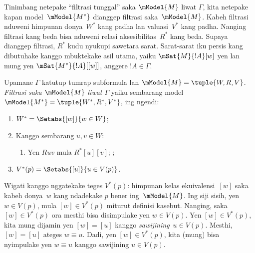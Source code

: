 \documentclass[../../../include/open-logic-section]{subfiles}
\begin{document}


Tinimbang netepake ``filtrasi tunggal'' saka $\mModel{M}$ liwat
$\Gamma$, kita netepake kapan model~$\mModel{M^*}$ dianggep filtrasi
saka~$\mModel{M}$. Kabeh filtrasi nduweni himpunan donya~$W^*$ kang
padha lan valuasi~$V^*$ kang padha. Nanging filtrasi kang beda bisa
nduweni relasi aksesibilitas~$R^*$ kang beda. Supaya dianggep filtrasi,
$R^*$ kudu nyukupi sawetara sarat. Sarat-sarat iku persis kang
dibutuhake kanggo mbuktekake asil utama, yaiku
$\mSat{M}{!A}[w]$ yen lan mung yen $\mSat{M^*}{!A}[{[w]}]$,
anggere $!A \in \Gamma$.

\begin{defn}
  Upamane $\Gamma$ katutup tumrap subformula lan
  $\mModel{M} = \tuple{W, R, V}$. \emph{Filtrasi saka $\mModel{M}$
  liwat $\Gamma$} yaiku sembarang model
  $\mModel{M^*} = \tuple{W^*,R^*,V^*}$, ing ngendi:
  \begin{enumerate}
  \item $W^* = \Setabs{[w]}{w \in W}$;
  \item {}%
    Kanggo sembarang $u,v \in W$:
    \begin{enumerate}
    \item {}%
      Yen $Ruv$ mula $R^*[u][v]$;
    ;
    \end{enumerate}
  \item $V^*(p) = \Setabs{[u]}{u \in V(p)}$.
  \end{enumerate}
\end{defn}

Wigati kanggo nggatekake teges $V^*(p)$: himpunan kelas
ekuivalensi~$[w]$ saka kabeh donya~$w$ kang ndadekake $p$ bener
ing~$\mModel{M}$. Ing siji sisih, yen $w \in V(p)$, mula $[w] \in
V^*(p)$ miturut definisi kasebut. Nanging, saka $[w] \in V^*(p)$
ora mesthi bisa disimpulake yen $w \in V(p)$. Yen $[w] \in V^*(p)$, kita mung
dijamin yen $[w] = [u]$ kanggo \emph{sawijining}~$u \in V(p)$.
Mesthi, $[w] = [u]$ ateges $w \equiv u$. Dadi, yen $[w] \in
V^*(p)$, kita (mung) bisa nyimpulake yen $w \equiv u$ kanggo sawijining
$u \in V(p)$.
\end{document}
